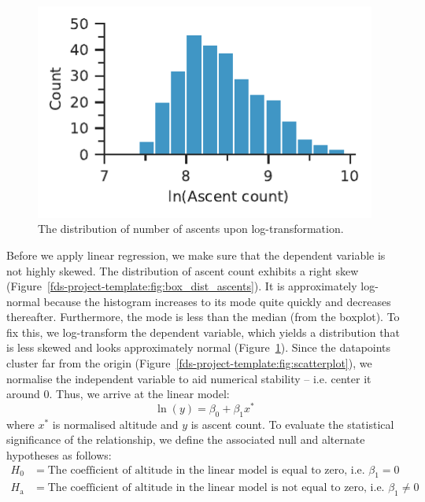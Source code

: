 \documentclass[11pt,a4paper]{article}
\begin{document}
\begin{figure} [h!]
  \centering
  \includegraphics{report/ascent_count_distribution.pdf}
  \caption{The distribution of number of ascents upon log-transformation.}
  \label{fds-project-template:fig:dist_log_ascent_count}
\end{figure}

Before we apply linear regression, we make sure that the dependent variable is not highly skewed. The distribution of ascent count exhibits a right skew (Figure~\ref{fds-project-template:fig:box_dist_ascents}). It is approximately log-normal because the histogram increases to its mode quite quickly and decreases thereafter. Furthermore, the mode is less than the median (from the boxplot). To fix this, we log-transform the dependent variable, which yields a distribution that is less skewed and looks approximately normal (Figure~\ref{fds-project-template:fig:dist_log_ascent_count}). Since the datapoints cluster far from the origin (Figure~\ref{fds-project-template:fig:scatterplot}), we normalise the independent variable to aid numerical stability – i.e. center it around 0. Thus, we arrive at the linear model: 
$$\ln(y)=\beta_0 + \beta_1 x^*$$
where $x^*$ is normalised altitude and $y$ is ascent count. To evaluate the statistical significance of the relationship, we define the associated null and alternate hypotheses as follows:
\begin{align*}
    H_0 &= \text{The coefficient of altitude in the linear model is equal to zero, i.e. $\beta_1=0$}\\
    H_\text{a} &= \text{The coefficient of altitude in the linear model is not equal to zero, i.e. $\beta_1\neq0$}
\end{align*}
\end{document}
